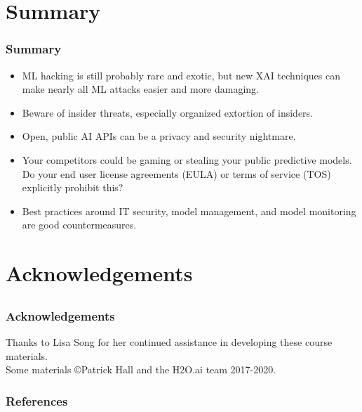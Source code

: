 \documentclass[11pt,
               aspectratio=169,
               hyperref={colorlinks}
               ]{beamer}
\begin{document}
	\section{Summary}

		\begin{frame}
		
			\frametitle{Summary}		
			
			\begin{itemize}
				\item ML hacking is still probably rare and exotic, but new XAI techniques can make nearly all ML attacks easier and more damaging.
				\item Beware of insider threats, especially organized extortion of insiders. 
				\item Open, public AI APIs can be a privacy and security nightmare. 
				\item Your competitors could be gaming or stealing your public predictive models. Do your end user license agreements (EULA) or terms of service (TOS) explicitly prohibit this?
				\item Best practices around IT security, model management, and model monitoring are good countermeasures.
			\end{itemize}
		
		\end{frame}

\section{Acknowledgements}

\subsection*{}

\begin{frame}
	
	\frametitle{Acknowledgements}
			
	Thanks to Lisa Song for her continued assistance in developing these course materials.\\
	\vspace{10pt}
	Some materials \copyright\hspace{1pt}Patrick Hall and the H2O.ai team 2017-2020.  
	
\end{frame}	


	\begin{frame}[t, allowframebreaks]
	
		\frametitle{References}		
		
		\printbibliography
		
	\end{frame}
\end{document}

